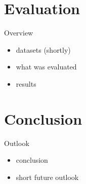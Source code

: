 \documentclass[10pt]{beamer}
\begin{document}
\section{Evaluation}

\begin{frame}[fragile]{Overview}
  \begin{itemize}
    \item datasets (shortly)
    \item what was evaluated
    \item results
  \end{itemize}
\end{frame}

\section{Conclusion}

\begin{frame}[fragile]{Outlook}
  \begin{itemize}
    \item conclusion
    \item short future outlook
  \end{itemize}
\end{frame}
\end{document}
